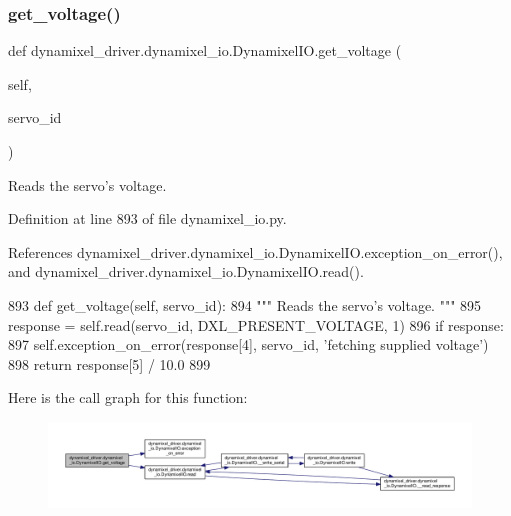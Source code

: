 \subsubsection{\texorpdfstring{get\+\_\+voltage()}{get\_voltage()}}
{\footnotesize\ttfamily def dynamixel\+\_\+driver.\+dynamixel\+\_\+io.\+Dynamixel\+I\+O.\+get\+\_\+voltage (\begin{DoxyParamCaption}\item[{}]{self,  }\item[{}]{servo\+\_\+id }\end{DoxyParamCaption})}

\begin{DoxyVerb}Reads the servo's voltage. \end{DoxyVerb}
 

Definition at line 893 of file dynamixel\+\_\+io.\+py.



References dynamixel\+\_\+driver.\+dynamixel\+\_\+io.\+Dynamixel\+I\+O.\+exception\+\_\+on\+\_\+error(), and dynamixel\+\_\+driver.\+dynamixel\+\_\+io.\+Dynamixel\+I\+O.\+read().


\begin{DoxyCode}
893     \textcolor{keyword}{def }get\_voltage(self, servo\_id):
894         \textcolor{stringliteral}{""" Reads the servo's voltage. """}
895         response = self.read(servo\_id, DXL\_PRESENT\_VOLTAGE, 1)
896         \textcolor{keywordflow}{if} response:
897             self.exception\_on\_error(response[4], servo\_id, \textcolor{stringliteral}{'fetching supplied voltage'})
898         \textcolor{keywordflow}{return} response[5] / 10.0
899 
\end{DoxyCode}
Here is the call graph for this function\+:
\nopagebreak
\begin{figure}[H]
\begin{center}
\leavevmode
\includegraphics[width=350pt]{dd/d77/classdynamixel__driver_1_1dynamixel__io_1_1_dynamixel_i_o_af5a22d82fcdd6fcbe0823c763f7bcc4d_cgraph}
\end{center}
\end{figure}
\mbox{\label{classdynamixel__driver_1_1dynamixel__io_1_1_dynamixel_i_o_ab11d3c841d1e858f350c2c2e32f10ec3}} 
